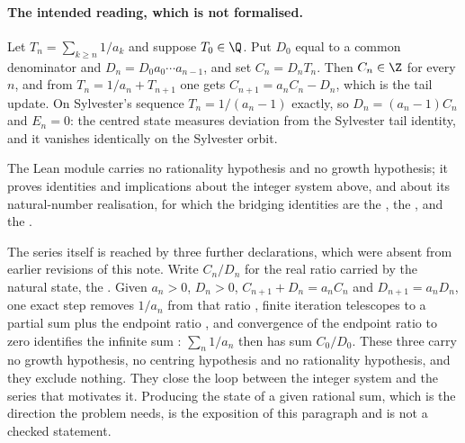 \paragraph{The intended reading, which is not formalised.}
Let $T_n=\sum_{k\ge n}1/a_k$ and suppose $T_0\in\Q$.  Put $D_0$ equal to a
common denominator and $D_n=D_0a_0\cdots a_{n-1}$, and set $C_n=D_nT_n$.  Then
$C_n\in\Z$ for every $n$, and from $T_n=1/a_n+T_{n+1}$ one gets
$C_{n+1}=a_nC_n-D_n$, which is the tail update.  On Sylvester's sequence
$T_n=1/(a_n-1)$ exactly, so $D_n=(a_n-1)C_n$ and $E_n=0$: the centred state
measures deviation from the Sylvester tail identity, and it vanishes
identically on the Sylvester orbit.

The Lean module carries no rationality hypothesis and no growth hypothesis; it
proves identities and implications about the integer system above, and about its
natural-number realisation, for which the bridging identities are the
, the
, and the
.

The series itself is reached by three further declarations, which were absent
from earlier revisions of this note.  Write $C_n/D_n$ for the real ratio carried
by the natural state, the
.
Given $a_n>0$, $D_n>0$, $C_{n+1}+D_n=a_nC_n$ and $D_{n+1}=a_nD_n$, one exact
step removes $1/a_n$ from that ratio
, finite iteration telescopes to a partial sum plus the
endpoint ratio
, and convergence of the endpoint ratio to zero identifies the
infinite sum
: $\sum_n1/a_n$ then has sum $C_0/D_0$.  These three carry no
growth hypothesis, no centring hypothesis and no rationality hypothesis, and
they exclude nothing.  They close the loop between the integer system and the
series that motivates it.  Producing the state of a given rational sum, which is
the direction the problem needs, is the exposition of this paragraph and is not a
checked statement.

